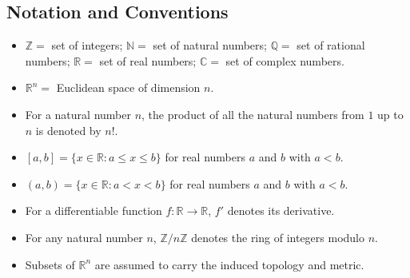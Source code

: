 \documentclass[11pt, a4paper]{article}
\begin{document}
\subsection*{Notation and Conventions}
\begin{itemize}
  \item $\mathbb{Z} =$ set of integers; $\mathbb{N} =$ set of natural numbers; $\mathbb{Q} =$ set of rational numbers; $\mathbb{R} =$ set of real numbers; $\mathbb{C} =$ set of complex numbers.
  \item $\mathbb{R}^n =$ Euclidean space of dimension $n$.
  \item For a natural number $n$, the product of all the natural numbers from $1$ up to $n$ is denoted by $n!$.
  \item $[a, b] = \{x \in \mathbb{R} : a \le x \le b\}$ for real numbers $a$ and $b$ with $a < b$.
  \item $(a, b) = \{x \in \mathbb{R} : a < x < b\}$ for real numbers $a$ and $b$ with $a < b$.
  \item For a differentiable function $f: \mathbb{R} \to \mathbb{R}$, $f'$ denotes its derivative.
  \item For any natural number $n$, $\mathbb{Z}/n\mathbb{Z}$ denotes the ring of integers modulo $n$.
  \item Subsets of $\mathbb{R}^n$ are assumed to carry the induced topology and metric.
\end{itemize}
\end{document}

